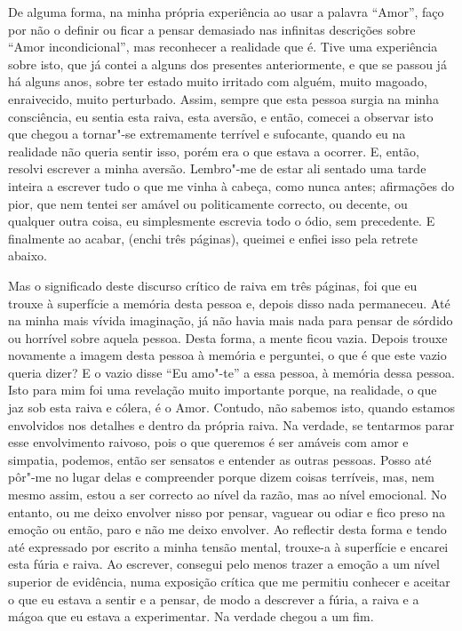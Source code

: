 De alguma forma, na minha própria experiência ao usar a palavra
``Amor'', faço por não o definir ou ficar a pensar demasiado nas
infinitas descrições sobre ``Amor incondicional'', mas reconhecer a
realidade que é. Tive uma experiência sobre isto, que já contei a alguns
dos presentes anteriormente, e que se passou já há alguns anos, sobre
ter estado muito irritado com alguém, muito magoado, enraivecido, muito
perturbado. Assim, sempre que esta pessoa surgia na minha consciência,
eu sentia esta raiva, esta aversão, e então, comecei a observar isto que
chegou a tornar"-se extremamente terrível e sufocante, quando eu na
realidade não queria sentir isso, porém era o que estava a ocorrer. E,
então, resolvi escrever a minha aversão. Lembro"-me de estar ali sentado
uma tarde inteira a escrever tudo o que me vinha à cabeça, como nunca
antes; afirmações do pior, que nem tentei ser amável ou politicamente
correcto, ou decente, ou qualquer outra coisa, eu simplesmente escrevia
todo o ódio, sem precedente. E finalmente ao acabar, (enchi três
páginas), queimei e enfiei isso pela retrete abaixo.

Mas o significado deste discurso crítico de raiva em três páginas, foi
que eu trouxe à superfície a memória desta pessoa e, depois disso nada
permaneceu. Até na minha mais vívida imaginação, já não havia mais nada
para pensar de sórdido ou horrível sobre aquela pessoa. Desta forma, a
mente ficou vazia. Depois trouxe novamente a imagem desta pessoa à
memória e perguntei, o que é que este vazio queria dizer? E o vazio
disse ``Eu amo"-te'' a essa pessoa, à memória dessa pessoa. Isto para mim
foi uma revelação muito importante porque, na realidade, o que jaz sob
esta raiva e cólera, é o Amor. Contudo, não sabemos isto, quando estamos
envolvidos nos detalhes e dentro da própria raiva. Na verdade, se
tentarmos parar esse envolvimento raivoso, pois o que queremos é ser
amáveis com amor e simpatia, podemos, então ser sensatos e entender as
outras pessoas. Posso até pôr"-me no lugar delas e compreender porque
dizem coisas terríveis, mas, nem mesmo assim, estou a ser correcto ao
nível da razão, mas ao nível emocional. No entanto, ou me deixo envolver
nisso por pensar, vaguear ou odiar e fico preso na emoção ou então, paro
e não me deixo envolver. Ao reflectir desta forma e tendo até expressado
por escrito a minha tensão mental, trouxe-a à superfície e encarei esta
fúria e raiva. Ao escrever, consegui pelo menos trazer a emoção a um
nível superior de evidência, numa exposição crítica que me permitiu
conhecer e aceitar o que eu estava a sentir e a pensar, de modo a
descrever a fúria, a raiva e a mágoa que eu estava a experimentar. Na
verdade chegou a um fim.


